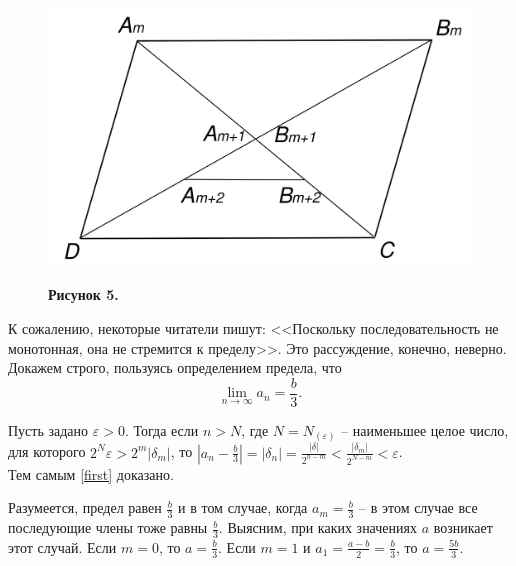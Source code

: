 \twocolumn
\begin{figure}[h]
    \centering
    \includegraphics[width=\linewidth]{piped.png}
    \begin{flushleft}
    \textbf{Рисунок 5.}
    \end{flushleft}
\end{figure}
К сожалению, некоторые читатели пишут: <<Поскольку последовательность не монотонная, она не стремится к пределу>>. Это рассуждение, конечно, неверно. Докажем строго, пользуясь определением предела, что \[\lim_{n\to\infty} a_n = \frac{b}{3}. \tag{4} \label{first}\] \par Пусть задано $\varepsilon>0$. Тогда если $n>N$, где $N = N_{(\varepsilon)}$ -- наименьшее целое число, для которого $2^N\varepsilon> 2^m|\delta_m|$, то $|a_n -\frac{b}{3}| = |\delta_n| =  \frac{|\delta|}{2^{n-m}} < \frac{|\delta_m|}{2^{N-m}} < \varepsilon$.\\ Тем самым \eqref{first} доказано. \par
Разумеется, предел равен $\frac{b}{3}$ и в том случае, когда $a_m = \frac{b}{3}$ -- в этом случае все последующие члены тоже равны $\frac{b}{3}$. Выясним, при каких значениях $a$ возникает этот случай. Если $m=0$, то $a=\frac{b}{3}$. Если $m=1$ и $a_1 = \frac{a-b}{2} = \frac{b}{3}$, то $a=\frac{5b}{3}$.\\
